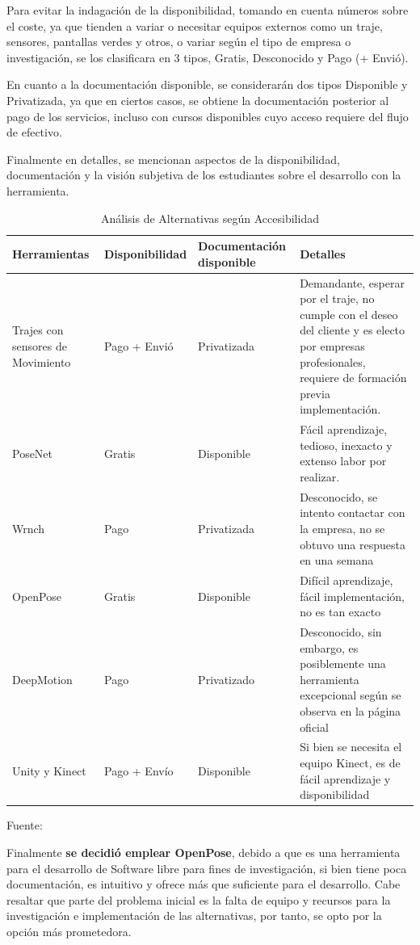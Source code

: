 Para evitar la indagación de la disponibilidad, tomando en cuenta números sobre el coste, ya que tienden a variar o necesitar equipos externos como un traje, sensores, pantallas verdes y otros, o variar según el tipo de empresa o investigación, se los clasificara en 3 tipos, Gratis, Desconocido y Pago (+ Envió).

En cuanto a la documentación disponible, se considerarán dos tipos Disponible y Privatizada, ya que en ciertos casos, se obtiene la documentación posterior al pago de los servicios, incluso con cursos disponibles cuyo acceso requiere del flujo de efectivo. 

Finalmente en detalles, se mencionan aspectos de la disponibilidad, documentación y la visión subjetiva de los estudiantes sobre el desarrollo con la herramienta.
\begin{table}[t]
	\begin{center}
		\begin{tabular}{| m{2.7cm} | m{2.5cm} | m{2.7cm} | m{7cm} |}
			\hline Herramientas & Disponibilidad & Documentación disponible & Detalles \\ \hline
			Trajes con sensores de Movimiento & Pago + Envió & Privatizada & Demandante, esperar por el traje, no cumple con el deseo del cliente y es electo por empresas profesionales, requiere de formación previa implementación.  \\ \hline
			PoseNet & Gratis & Disponible &  Fácil aprendizaje, tedioso, inexacto y extenso labor por realizar. \\ \hline
			Wrnch & Pago & Privatizada &  Desconocido, se intento contactar con la empresa, no se obtuvo una respuesta en una semana \\ \hline
			OpenPose & Gratis & Disponible &  Difícil aprendizaje, fácil implementación, no es tan exacto \\ \hline
			DeepMotion & Pago & Privatizado & Desconocido, sin embargo, es posiblemente una herramienta excepcional según se observa en la página oficial \\ \hline
			Unity y Kinect & Pago + Envío & Disponible & Si bien se necesita el equipo Kinect, es de fácil aprendizaje y disponibilidad  \\ \hline
		\end{tabular}
		\caption{Análisis de Alternativas según Accesibilidad}
		\footnotesize Fuente:\cite{8765346}
	\end{center}
\end{table}

Finalmente \textbf{se decidió emplear OpenPose}, debido a que es una herramienta para el desarrollo de Software libre para fines de investigación, si bien tiene poca documentación, es intuitivo y ofrece más que suficiente para el desarrollo. Cabe resaltar que parte del problema inicial es la falta de equipo y recursos para la investigación e implementación de las alternativas, por tanto, se opto por la opción más prometedora.







